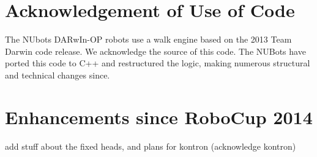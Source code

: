 \documentclass{llncs}
\begin{document}
\section{Acknowledgement of Use of Code}
The NUbots DARwIn-OP robots use a walk engine based on the 2013 Team Darwin code release. We acknowledge the source of this code. The NUBots have ported this code to C++ and restructured the logic, making numerous structural and technical changes since. %

\section{Enhancements since RoboCup 2014}
\TODO add stuff about the fixed heads, and plans for kontron (acknowledge kontron)





\end{document}
